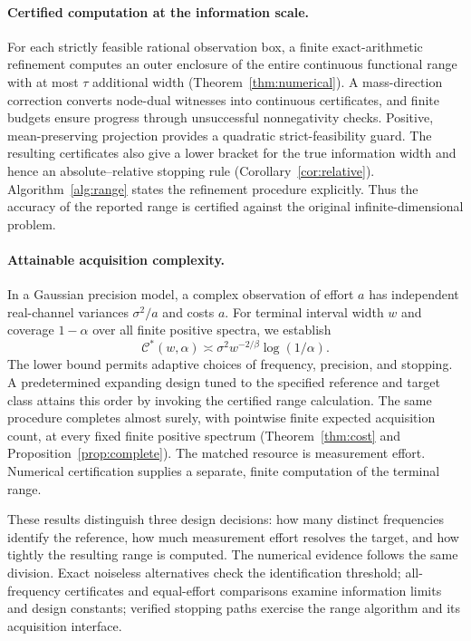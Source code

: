 \documentclass[10pt]{amsart}
\theoremstyle{definition}
\theoremstyle{remark}
\begin{document}
\paragraph{Certified computation at the information scale.}
For each strictly feasible rational observation box, a finite exact-arithmetic refinement computes an outer enclosure of the entire continuous functional range with at most $\tau$ additional width (Theorem~\ref{thm:numerical}). A mass-direction correction converts node-dual witnesses into continuous certificates, and finite budgets ensure progress through unsuccessful nonnegativity checks. Positive, mean-preserving projection provides a quadratic strict-feasibility guard. The resulting certificates also give a lower bracket for the true information width and hence an absolute--relative stopping rule (Corollary~\ref{cor:relative}). Algorithm~\ref{alg:range} states the refinement procedure explicitly. Thus the accuracy of the reported range is certified against the original infinite-dimensional problem.

\paragraph{Attainable acquisition complexity.}
In a Gaussian precision model, a complex observation of effort $a$ has independent real-channel variances $\sigma^2/a$ and costs $a$. For terminal interval width $w$ and coverage $1-\alpha$ over all finite positive spectra, we establish
\begin{equation}\label{eq:cost-summary}
 \mathcal C^*(w,\alpha)\asymp\sigma^2w^{-2/\beta}\log(1/\alpha).
\end{equation}
The lower bound permits adaptive choices of frequency, precision, and stopping. A predetermined expanding design tuned to the specified reference and target class attains this order by invoking the certified range calculation. The same procedure completes almost surely, with pointwise finite expected acquisition count, at every fixed finite positive spectrum (Theorem~\ref{thm:cost} and Proposition~\ref{prop:complete}). The matched resource is measurement effort. Numerical certification supplies a separate, finite computation of the terminal range.

These results distinguish three design decisions: how many distinct frequencies identify the reference, how much measurement effort resolves the target, and how tightly the resulting range is computed. The numerical evidence follows the same division. Exact noiseless alternatives check the identification threshold; all-frequency certificates and equal-effort comparisons examine information limits and design constants; verified stopping paths exercise the range algorithm and its acquisition interface.
\end{document}
